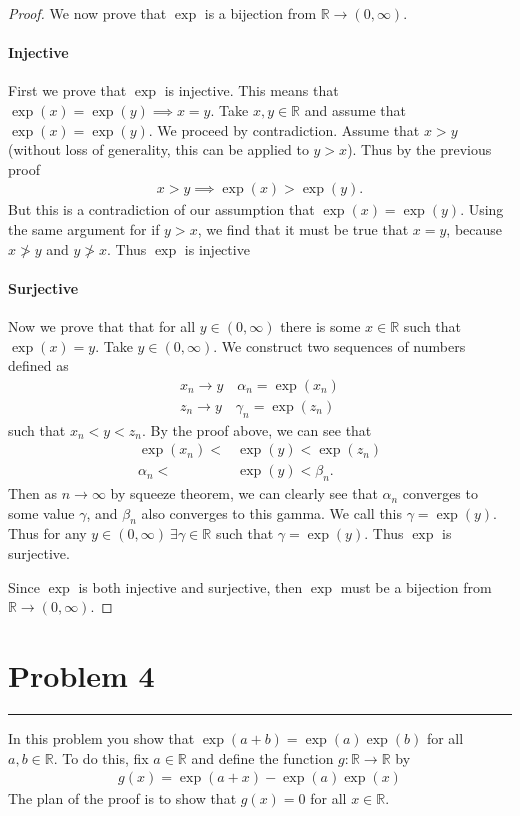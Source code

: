 \documentclass[12pt]{amsart}
\newcommand{\usec}[1]{%
\section*{#1}%
\noindent\rule{\textwidth}{2pt}%
\vspace{10pt}%
}
\newcommand{\R}{\mathbb{R}}
\begin{document}
\begin{proof}
  We now prove that $\exp$ is a bijection from $\R\to(0,\infty)$.

  \paragraph{Injective}%
  \label{par:injective}
  First we prove that $\exp$ is injective. This means that
  $\exp(x)=\exp(y)\implies x=y$. Take $x,y\in\R$ and assume that
  $\exp(x)=\exp(y)$. We proceed by contradiction. Assume that $x>y$ (without
  loss of generality, this can be applied to $y>x$). Thus by the previous proof
  \begin{align*}
    x>y\implies \exp(x)>\exp(y).
  \end{align*}
  But this is a contradiction of our assumption that $\exp(x)=\exp(y)$. Using
  the same argument for if $y>x$, we find that it must be true that $x=y$,
  because $x\ngtr y$ and $y\ngtr x$. Thus $\exp$ is injective

  \paragraph{Surjective}%
  \label{par:surjective}
  Now we prove that that for all $y\in(0,\infty)$ there is some $x\in\R$ such
  that $\exp(x)=y$. Take $y\in(0,\infty)$. We construct two sequences of
  numbers defined as
  \begin{align*}
    x_n\to y\quad \alpha_n=\exp(x_n)\\
    z_n\to y\quad \gamma_n=\exp(z_n)
  \end{align*}
  such that $x_n<y<z_n$. By the proof above, we can see that
  \begin{align*}
    \exp(x_n)<&\exp(y)<\exp(z_n)\\
    \alpha_n < &\exp(y) < \beta_n.
  \end{align*}
  Then as $n\to\infty$ by squeeze theorem, we can clearly see that $\alpha_n$
  converges to some value $\gamma$, and $\beta_n$ also converges to this gamma.
  We call this $\gamma=\exp(y)$. Thus for any $y\in(0,\infty)\ \exists
  \gamma\in\R$ such that $\gamma=\exp(y)$. Thus $\exp$ is surjective.

  Since $\exp$ is both injective and surjective, then $\exp$ must be a
  bijection from $\R\to(0,\infty)$.
\end{proof}

\usec{Problem 4}%
\label{sec:problem_4}

In this problem you show that $\exp(a+b)=\exp(a)\exp(b)$ for all $a,b\in\R$. To
do this, fix $a\in \R$ and define the function $g:\R\to\R$ by
\begin{align*}
  g(x)=\exp(a+x)-\exp(a)\exp(x)
\end{align*}
The plan of the proof is to show that $g(x)=0$ for all $x\in\R$.
\end{document}
